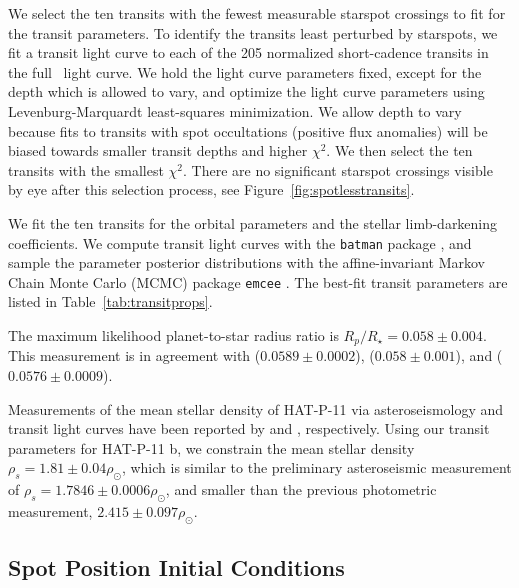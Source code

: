We select the ten transits with the fewest measurable starspot crossings to fit for the transit parameters. To identify the transits least perturbed by starspots, we fit a \citet{Mandel2002} transit light curve to each of the 205 normalized short-cadence transits in the full \kepler\ light curve. We hold the light curve parameters fixed, except for the depth which is allowed to vary, and optimize the light curve parameters using Levenburg-Marquardt least-squares minimization. We allow depth to vary because fits to transits with spot occultations (positive flux anomalies) will be biased towards smaller transit depths and higher $\chi^2$. We then select the ten transits with the smallest $\chi^2$. There are no significant starspot crossings visible by eye after this selection process, see Figure~\ref{fig:spotlesstransits}. 

We fit the ten transits for the orbital parameters and the stellar limb-darkening coefficients. We compute transit light curves with the \texttt{batman} package \citep{Kreidberg2015}, and sample the parameter posterior distributions with the affine-invariant Markov Chain Monte Carlo (MCMC) package \texttt{emcee} \citep{Foreman-Mackey2013}. The best-fit transit parameters are listed in Table~\ref{tab:transitprops}. 

The maximum likelihood planet-to-star radius ratio is $R_p/R_\star = 0.058 \pm 0.004$. This measurement is in agreement with \citet{Deming2011} ($0.0589 \pm 0.0002$), \citet{Southworth2011} ($0.058 \pm 0.001$), and \citet{bakos2010} ($0.0576 \pm 0.0009$).

Measurements of the mean stellar density of HAT-P-11 via asteroseismology and transit light curves have been reported by \citet{Christensen-Dalsgaard2010} and \citet{Southworth2011}, respectively. Using our transit parameters for HAT-P-11 b, we constrain the mean stellar density $\rho_s = 1.81 \pm 0.04 \rho_\odot$, which is similar to the preliminary asteroseismic measurement of $\rho_s = 1.7846 \pm 0.0006 \rho_\odot$, and smaller than the previous photometric measurement, $2.415 \pm 0.097\rho_\odot$.

\subsection{Spot Position Initial Conditions} \label{sec:spotoccmodel}

